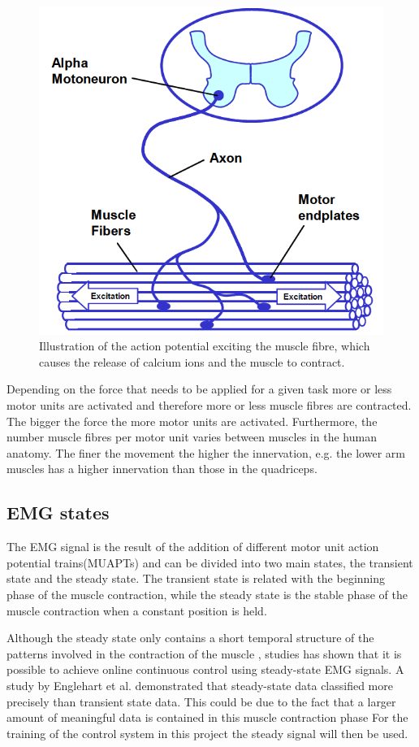 \begin{figure}[H]
	\includegraphics[width=.4\textwidth]{figures/Anatomy/EMG_generation}  %
	\caption{Illustration of the action potential exciting the muscle fibre, which causes the release of calcium ions and the muscle to contract. \cite{konrad2005}}
	\label{fig:EMG_generation}  %
\end{figure}

Depending on the force that needs to be applied for a given task more or less motor units are activated and therefore more or less muscle fibres are contracted. The bigger the force the more motor units are activated. Furthermore, the number muscle fibres per motor unit varies between muscles in the human anatomy. The finer the movement the higher the innervation, e.g. the lower arm muscles has a higher innervation than those in the quadriceps. \cite{cram2012}

\subsection{EMG states}
The EMG signal is the result of the addition of different motor unit action potential trains(MUAPTs) and can be divided into two main states, the transient state and the steady state. The transient state is related with the beginning phase of the muscle contraction, while the steady state is the stable phase of the muscle contraction when a constant position is held. \cite{mobarak2014}

Although the steady state only contains a short temporal structure of the patterns involved in the contraction of the muscle \cite{mobarak}, studies has shown that it is possible to achieve online continuous control using steady-state EMG signals. A study by Englehart et al. \cite{} demonstrated that steady-state data classified more precisely than transient state data. This could be due to the fact that a larger amount of meaningful data is contained in this muscle contraction phase \cite{mobarak} For the training of the control system  in this project the steady signal will then be used. %

